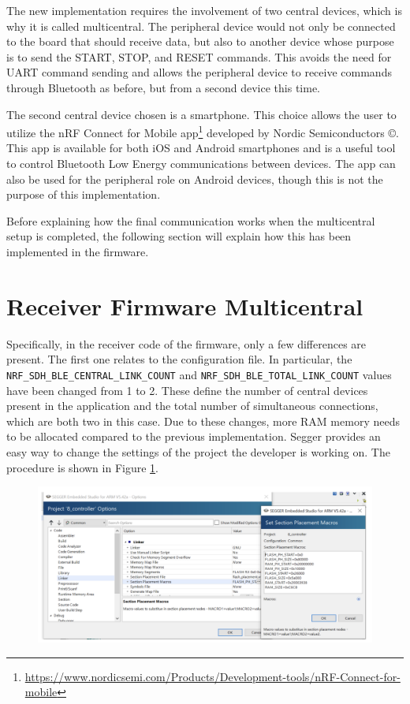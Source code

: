 \documentclass{Configuration_Files/PoliMi3i_thesis}
\begin{document}
The new implementation requires the involvement of two central devices, which is why it is called multicentral. The peripheral device would not only be connected to the board that should receive data, but also to another device whose purpose is to send the START, STOP, and RESET commands. This avoids the need for UART command sending and allows the peripheral device to receive commands through Bluetooth as before, but from a second device this time.

The second central device chosen is a smartphone. This choice allows the user to utilize the nRF Connect for Mobile app\footnote{\url{https://www.nordicsemi.com/Products/Development-tools/nRF-Connect-for-mobile}} developed by Nordic Semiconductors ©. This app is available for both iOS and Android smartphones and is a useful tool to control Bluetooth Low Energy communications between devices. The app can also be used for the peripheral role on Android devices, though this is not the purpose of this implementation.

Before explaining how the final communication works when the multicentral setup is completed, the following section will explain how this has been implemented in the firmware.

\section{Receiver Firmware Multicentral}
Specifically, in the receiver code of the firmware, only a few differences are present. The first one relates to the configuration file. In particular, the \texttt{NRF\_SDH\_BLE\_CENTRAL\_LINK\_COUNT} and \texttt{NRF\_SDH\_BLE\_TOTAL\_LINK\_COUNT} values have been changed from 1 to 2. These define the number of central devices present in the application and the total number of simultaneous connections, which are both two in this case. Due to these changes, more RAM memory needs to be allocated compared to the previous implementation. Segger provides an easy way to change the settings of the project the developer is working on. The procedure is shown in Figure \ref{fig:memory_allocation_seggar}.

\begin{figure}[H]
    \centering
    \includegraphics[scale=0.3]{Multicentral/3.png}
    \label{fig:memory_allocation_seggar}
\end{figure}
\end{document}
